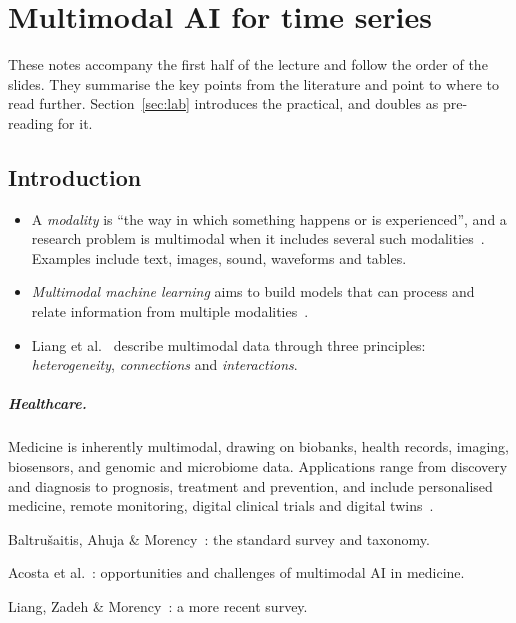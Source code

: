 \chapter{Multimodal AI for time series}
\label{chap:lecture_01}

These notes accompany the first half of the lecture and follow the order of the
slides. They summarise the key points from the literature and point to where to
read further. Section~\ref{sec:lab} introduces the practical, and doubles as
pre-reading for it.


\section{Introduction}
\label{sec:intro}

\begin{itemize}
  \item A \emph{modality} is ``the way in which something happens or is
        experienced'', and a research problem is multimodal when it includes
        several such modalities~\cite{baltrusaitis2019multimodal}. Examples include
        text, images, sound, waveforms and tables.
  \item \emph{Multimodal machine learning} aims to build models that can process
        and relate information from multiple modalities~\cite{baltrusaitis2019multimodal}.
  \item Liang et al.~\cite{liang2024foundations} describe multimodal data through
        three principles: \emph{heterogeneity}, \emph{connections} and
        \emph{interactions}.
\end{itemize}

\paragraph{Healthcare.} Medicine is inherently multimodal, drawing on biobanks,
health records, imaging, biosensors, and genomic and microbiome data. Applications
range from discovery and diagnosis to prognosis, treatment and prevention, and
include personalised medicine, remote monitoring, digital clinical trials and
digital twins~\cite{acosta2022multimodal}.

\begin{furtherreading}
  \item Baltru\v{s}aitis, Ahuja \& Morency~\cite{baltrusaitis2019multimodal}: the
        standard survey and taxonomy.
  \item Acosta et al.~\cite{acosta2022multimodal}: opportunities and challenges of
        multimodal AI in medicine.
  \item Liang, Zadeh \& Morency~\cite{liang2024foundations}: a more recent survey.
\end{furtherreading}


